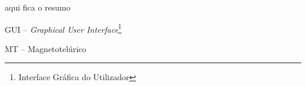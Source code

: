 \documentclass[12pt,twoside,oneright,a4paper,chapter=TITLE,english,brazil]{unipampa}
\newcommand{\en}[1]{\textit{#1}}
\begin{document}
\imprimircapa                   %

\imprimirfolhaderosto*          %

\imprimirfichacatalografica     %

\imprimirfolhadeaprovacao       %




    




\begin{resumo}
 aqui fica o resumo
\end{resumo}




\listoffigures      %
\listoftables       %


\begin{siglas}
    \item[GUI --]              \en{Graphical User Interface}\footnote{Interface Gráfica do Utilizador}
    \item[MT --]               Magnetotelúrico
\end{siglas}
\end{document}
